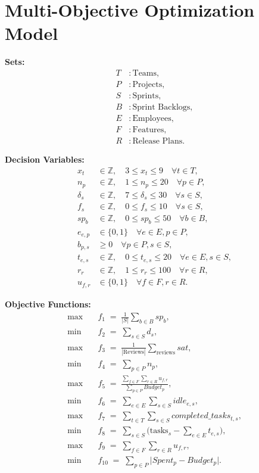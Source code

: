 \documentclass{article}
\begin{document}
\section*{Multi-Objective Optimization Model}

\textbf{Sets:}
\begin{align*}
T &: \text{Teams},\\
P &: \text{Projects},\\
S &: \text{Sprints},\\
B &: \text{Sprint Backlogs},\\
E &: \text{Employees},\\
F &: \text{Features},\\
R &: \text{Release Plans}.
\end{align*}

\textbf{Decision Variables:}
\begin{align*}
x_t &\in \mathbb{Z},\quad 3 \le x_t \le 9 \quad \forall t\in T,\\
n_p &\in \mathbb{Z},\quad 1 \le n_p \le 20 \quad \forall p\in P,\\
\delta_s &\in \mathbb{Z},\quad 7 \le \delta_s \le 30 \quad \forall s\in S,\\
f_s &\in \mathbb{Z},\quad 0 \le f_s \le 10 \quad \forall s\in S,\\
sp_b &\in \mathbb{Z},\quad 0 \le sp_b \le 50 \quad \forall b\in B,\\
e_{e,p} &\in \{0,1\}\quad \forall e\in E,p\in P,\\
b_{p,s} &\ge 0 \quad \forall p\in P,s\in S,\\
t_{e,s} &\in \mathbb{Z},\quad 0 \le t_{e,s} \le 20 \quad \forall e\in E,s\in S,\\
r_r &\in \mathbb{Z},\quad 1 \le r_r \le 100 \quad \forall r\in R,\\
u_{f,r} &\in \{0,1\}\quad \forall f\in F,r\in R.
\end{align*}

\textbf{Objective Functions:}
\begin{align*}
\max &\quad f_1 \;=\; \frac{1}{|S|}\sum_{b\in B} sp_b,\\
\min &\quad f_2 \;=\; \sum_{s\in S} d_s,\\
\max &\quad f_3 \;=\; \frac{1}{|\text{Reviews}|}\sum_{\text{reviews}} sat,\\
\min &\quad f_4 \;=\; \sum_{p\in P} n_p,\\
\max &\quad f_5 \;=\; \frac{\sum_{f\in F}\sum_{r\in R} u_{f,r}}{\sum_{p\in P}Budget_p},\\
\min &\quad f_6 \;=\; \sum_{e\in E}\sum_{s\in S} idle_{e,s},\\
\max &\quad f_7 \;=\; \sum_{t\in T}\sum_{s\in S} completed\_tasks_{t,s},\\
\min &\quad f_8 \;=\; \sum_{s\in S} \bigl(\text{tasks}_s - \sum_{e\in E}t_{e,s}\bigr),\\
\max &\quad f_9 \;=\; \sum_{f\in F}\sum_{r\in R} u_{f,r},\\
\min &\quad f_{10} \;=\; \sum_{p\in P}\bigl|Spent_p - Budget_p\bigr|.
\end{align*}
\end{document}
